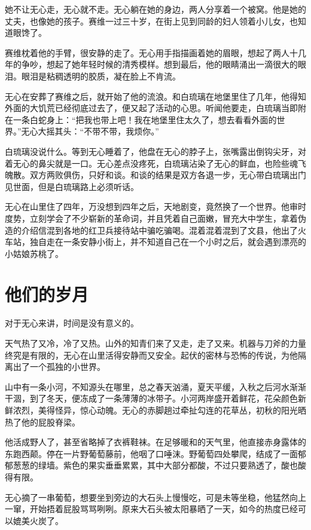 她不让无心走，无心就不走。无心躺在她的身边，两人分享着一个被窝。他是她的丈夫，也像她的孩子。赛维一过三十岁，在街上见到同龄的妇人领着小儿女，也知道眼馋了。

赛维枕着他的手臂，很安静的走了。无心用手指描画着她的眉眼，想起了两人十几年的争吵，想起了她年轻时候的清秀模样。想到最后，他的眼睛涌出一滴很大的眼泪。眼泪是粘稠透明的胶质，凝在脸上不肯流。

无心在安葬了赛维之后，就开始了他的流浪。和白琉璃在地堡里住了几年，他得知外面的大饥荒已经彻底过去了，便又起了活动的心思。听闻他要走，白琉璃当即附在一条白蛇身上：``把我也带上吧！我在地堡里住太久了，想去看看外面的世界。''无心大摇其头：``不带不带，我烦你。''

白琉璃没说什么。等到无心睡着了，他盘在无心的脖子上，张嘴露出倒钩尖牙，对着无心的鼻尖就是一口。无心差点没疼死，白琉璃沾染了无心的鲜血，也险些魂飞魄散。双方两败俱伤，只好和谈。和谈的结果是双方各退一步，无心带白琉璃出门见世面，但是白琉璃路上必须听话。

无心在山里住了四年，万没想到四年之后，天地剧变，竟然换了一个世界。他审时度势，立刻学会了不少崭新的革命词，并且凭着自己面嫩，冒充大中学生，拿着伪造的介绍信混到各地的红卫兵接待站中骗吃骗喝。混着混着混到了文县，他出了火车站，独自走在一条安静小街上，并不知道自己在一个小时之后，就会遇到漂亮的小姑娘苏桃了。

\chapter{他们的岁月}

对于无心来讲，时间是没有意义的。

天气热了又冷，冷了又热。山外的知青们来了又走，走了又来。机器与刀斧的力量终究是有限的，无心在山里活得安静而又安全。起伏的密林与恐怖的传说，为他隔离出了一个孤独的小世界。

山中有一条小河，不知源头在哪里，总之春天汹涌，夏天平缓，入秋之后河水渐渐干涸，到了冬天，便冻成了一条薄薄的冰带子。小河两岸盛开着鲜花，花朵颜色新鲜浓烈，美得怪异，惊心动魄。无心的赤脚趟过牵扯勾连的花草丛，初秋的阳光晒热了他的屁股脊梁。

他活成野人了，甚至省略掉了衣裤鞋袜。在足够暖和的天气里，他直接赤身露体的东跑西颠。停在一片野葡萄藤前，他咽了口唾沫。野葡萄四处攀爬，结成了一面郁郁葱葱的绿墙。紫色的果实垂垂累累，其中大部分都酸，不过只要熟透了，酸也酸得有限。

无心摘了一串葡萄，想要坐到旁边的大石头上慢慢吃，可是未等坐稳，他猛然向上一窜，开始捂着屁股骂骂咧咧。原来大石头被太阳暴晒了一天，如今的热度已经可以媲美火炭了。

